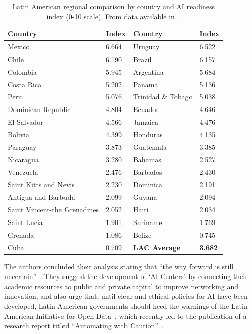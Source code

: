 \documentclass[conference]{IEEEtran}
\begin{document}
\begin{table}[!t]
\caption{Latin American regional comparison by country and AI readiness index (0-10 scale). From data available in~\cite{miller2019government}.}
\label{tbl:ai-index}
\centering
\begin{tabular}{|l|l||l|l|}
\hline
\textbf{Country} & \textbf{Index} & \textbf{Country} & \textbf{Index} \\
\hline
Mexico & 6.664 & Uruguay & 6.522 \\
Chile & 6.190 & Brazil & 6.157 \\  
Colombia & 5.945 & Argentina & 5.684 \\
Costa Rica & 5.202 & Panama & 5.136 \\ 
Peru & 5.076 & Trinidad \& Tobago & 5.038 \\
Dominican Republic & 4.804 & Ecuador & 4.646 \\
El Salvador & 4.566 & Jamaica & 4.476 \\     
Bolivia & 4.399 & Honduras & 4.135 \\ \hline 
Paraguay & 3.873 & Guatemala & 3.385 \\
Nicaragua & 3.280 & Bahamas & 2.527 \\ 
Venezuela & 2.476 & Barbados & 2.430 \\
Saint Kitts and Nevis & 2.230 & Dominica & 2.191 \\
Antigua and Barbuda & 2.099 & Guyana & 2.094 \\
Saint Vincent-the Grenadines & 2.052 & Haiti & 2.034 \\
Saint Lucia & 1.901 & Suriname & 1.769 \\    
Grenada & 1.086 & Belize & 0.745 \\
Cuba & 0.709 & \textbf{LAC Average} & \textbf{3.682} \\
\hline
\end{tabular}
\end{table}

The authors concluded their analysis stating that ``the way forward is still uncertain''~\cite{miller2019government}. They suggest the development of `AI Centers' by connecting their academic resources to public and private capital to improve networking and innovation, and also urge that, until clear and ethical policies for AI have been developed, Latin American governments should heed the warnings of the Latin American Initiative for Open Data~\cite{davies2019the}, which recently led to the publication of a research report titled ``Automating with Caution''~\cite{scrollini2018automatizar}.
\end{document}
